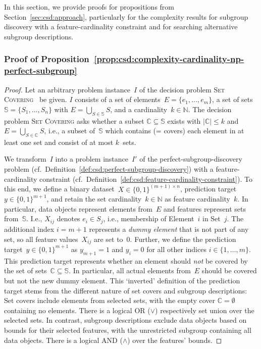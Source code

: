 \documentclass{article}
\theoremstyle{definition}
\begin{document}
In this section, we provide proofs for propositions from Section~\ref{sec:csd:approach}, particularly for the complexity results for subgroup discovery with a feature-cardinality constraint and for searching alternative subgroup descriptions.

\subsubsection{Proof of Proposition~\ref{prop:csd:complexity-cardinality-np-perfect-subgroup}}
\label{sec:csd:appendix:proofs:complexity-cardinality-np-perfect-subgroup}

\begin{proof}
Let an arbitrary problem instance~$I$ of the decision problem \textsc{Set Covering}~\cite{karp1972reducibility} be given.
$I$ consists of a set of elements~$E = \{e_1, \dots, e_m\}$, a set of sets~$\mathbb{S} = \{S_1,  \dots, S_n\}$ with $E = \bigcup_{S \in \mathbb{S}} S$, and a cardinality~$k \in \mathbb{N}$.
The  decision problem \textsc{Set Covering} asks whether a subset $\mathbb{C} \subseteq \mathbb{S}$ exists with $|\mathbb{C}| \leq k$ and $E = \bigcup_{S \in \mathbb{C}} S$, i.e., a subset of~$\mathbb{S}$ which contains (= covers) each element in at least one set and consist of at most $k$~sets.

We transform~$I$ into a problem instance~$I'$ of the perfect-subgroup-discovery problem (cf.~Definition~\ref{def:csd:perfect-subgroup-discovery}) with a feature-cardinality constraint (cf.~Definition~\ref{def:csd:feature-cardinality-constraint}).
To this end, we define a binary dataset~$X \in \{0, 1\}^{(m + 1) \times n}$, prediction target~$y \in \{0, 1\}^{m+1}$, and retain the set cardinality~$k \in \mathbb{N}$ as feature cardinality~$k$.
In particular, data objects represent elements from~$E$ and features represent sets from~$\mathbb{S}$.
I.e., $X_{ij}$ denotes $e_i \in S_j$, i.e., membership of Element~$i$ in Set~$j$.
The additional index $i = m + 1$ represents a \emph{dummy element} that is not part of any set, so all feature values~$X_{ij}$ are set to~0.
Further, we define the prediction target~$y \in \{0, 1\}^{m+1}$ as $y_{m+1} = 1$ and $y_i = 0$ for all other indices $i \in \{1, \dots, m\}$.
This prediction target represents whether an element should \emph{not} be covered by the set of sets~$\mathbb{C} \subseteq \mathbb{S}$.
In particular, all actual elements from~$E$ should be covered but not the new dummy element.
This `inverted' definition of the prediction target stems from the different nature of set covers and subgroup descriptions:
Set covers include elements from selected sets, with the empty cover $\mathbb{C} = \emptyset$ containing no elements.
There is a logical OR ($\lor$) respectively set union over the selected sets.
In contrast, subgroup descriptions exclude data objects based on bounds for their selected features, with the unrestricted subgroup containing all data objects.
There is a logical AND ($\land$) over the features' bounds.


\end{proof}
\end{document}
